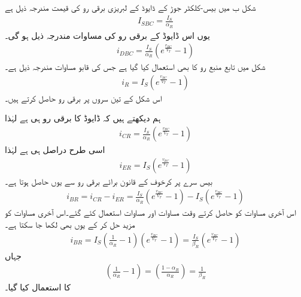 شکل  ب میں بیس-کلکٹر جوڑ کے ڈایوڈ کے لبریزی برقی رو کی قیمت مندرجہ ذیل ہے
\begin{align}
I_{SBC}=\frac{I_S}{\alpha_R}
\end{align}
یوں اس ڈایوڈ کے برقی رو کی مساوات مندرجہ ذیل ہو گی۔
\begin{align}
i_{DBC}=\frac{I_S}{\alpha_R} \left(e^{\frac{v_{BC}}{V_T}}-1 \right )
\end{align}
شکل میں تابع منبع رو  کا بھی استعمال کیا گیا ہے جس کی قابو مساوات مندرجہ ذیل ہے۔
\begin{align}
i_R = I_S \left (e^{\frac{v_{BC}}{V_T}}-1 \right )
\end{align}
اس شکل کے تین سروں پر برقی رو حاصل کرتے ہیں۔

ہم دیکھتے ہیں کہ ڈایوڈ کا برقی رو ہی  ہے لہٰذا
\begin{align} \label{مساوات_ٹرانزسٹر_کلکٹر _الٹی_رو}
i_{CR}=\frac{I_S}{\alpha_R} \left (e^{\frac{v_{BC}}{V_T}}-1 \right )
\end{align}
اسی طرح   دراصل  ہی ہے لہٰذا
\begin{align} \label{مساوات_ٹرانزسٹر_مخارج_الٹی_رو}
i_{ER}=I_S \left (e^{\frac{v_{BC}}{V_T}}-1 \right )
\end{align}
بیس سرے پر کرخوف کے قانون برائے برقی رو سے  یوں حاصل ہوتا ہے۔
\begin{align} \label{مساوات_ٹرانزسٹر_قابو_الٹی_رو_الف}
i_{BR}=i_{CR}-i_{ER}=\frac{I_S}{\alpha_R} \left (e^{\frac{v_{BC}}{V_T}}-1 \right )-I_S \left (e^{\frac{v_{BC}}{V_T}}-1 \right )
\end{align}
اس آخری مساوات کو حاصل کرتے وقت مساوات   اور مساوات   استعمال کئے گئے۔اس آخری مساوات کو مزید حل کر کے یوں بھی لکھا جا سکتا ہے۔
\begin{align}
i_{BR}=I_S \left (\frac{1}{\alpha_R}-1 \right ) \left (e^{\frac{v_{BC}}{V_T}}-1 \right )=\frac{I_S}{\beta_R} \left (e^{\frac{v_{BC}}{V_T}}-1 \right )
\end{align}
جہاں
\begin{align}
\left (\frac{1}{\alpha_R}-1 \right )=\left (\frac{1-\alpha_R}{\alpha_R} \right )=\frac{1}{\beta_R}
\end{align}
کا استعمال کیا گیا۔

